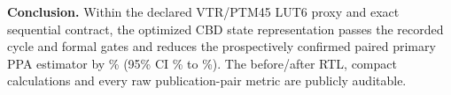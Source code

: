 \documentclass[10pt,a4paper]{article}
\begin{document}
\vspace{3mm}
\begin{claimbox}
\textbf{Conclusion.} Within the declared VTR/PTM45 LUT6 proxy and exact sequential contract, the optimized CBD state representation passes the recorded cycle and formal gates and reduces the prospectively confirmed paired primary PPA estimator by \CompositeImprovement\% (95\% CI \CompositeLow\% to \CompositeHigh\%). The before/after RTL, compact calculations and every raw publication-pair metric are publicly auditable.
\end{claimbox}
\end{document}
